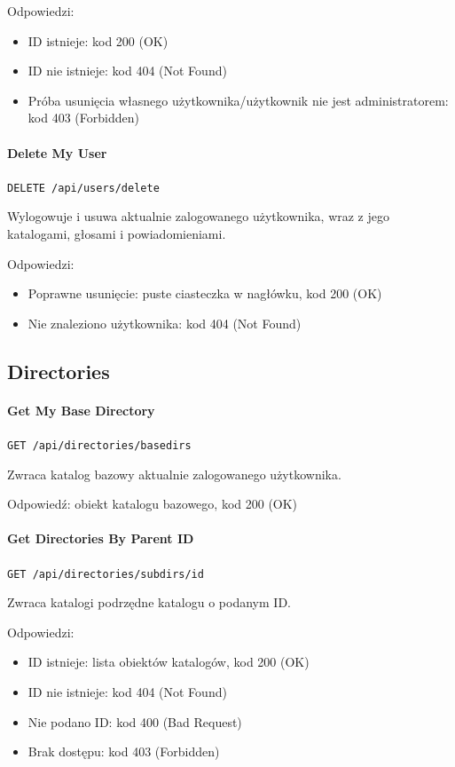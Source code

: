 \documentclass[a4paper,twoside,12pt]{book}
\begin{document}
Odpowiedzi: 
\begin{itemize}
	\item ID istnieje: kod 200 (OK) 
	\item ID nie istnieje: kod 404 (Not Found) 
	\item Próba usunięcia własnego użytkownika/użytkownik nie jest administratorem: kod 403 (Forbidden)
\end{itemize}

\paragraph{Delete My User}

\texttt{DELETE /api/users/delete}

Wylogowuje i usuwa aktualnie zalogowanego użytkownika, wraz z jego katalogami, głosami i powiadomieniami.

Odpowiedzi: 
\begin{itemize}
	\item  Poprawne usunięcie: puste ciasteczka w nagłówku, kod 200 (OK) 
	\item  Nie znaleziono użytkownika: kod 404 (Not Found)
\end{itemize}

\subsection{Directories}

\paragraph{Get My Base Directory}

\texttt{GET /api/directories/basedirs}

Zwraca katalog bazowy aktualnie zalogowanego użytkownika.

Odpowiedź: obiekt katalogu bazowego, kod 200 (OK)

\paragraph{Get Directories By Parent ID}

\texttt{GET /api/directories/subdirs/{id}}

Zwraca katalogi podrzędne katalogu o podanym ID.

Odpowiedzi: 
\begin{itemize}
	\item ID istnieje: lista obiektów katalogów, kod 200 (OK) 
	\item ID nie istnieje: kod 404 (Not Found) 
	\item Nie podano ID: kod 400 (Bad Request)
	\item Brak dostępu: kod 403 (Forbidden)
\end{itemize}
\end{document}
